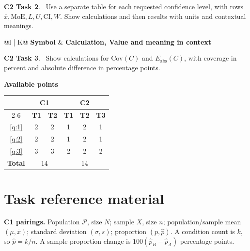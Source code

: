 \textbf{C2 Task 2}. \cTwoB\ Use a separate table for each requested confidence level, with rows $\bar x,\mathrm{MoE},L,U,\mathrm{CI},W$. Show calculations and then results with units and contextual meanings.
\begin{center}
\begin{tabularx}{\linewidth}{@{}l | K@{}}
\toprule
\textbf{Symbol} & \textbf{Calculation, Value and meaning in context}\\
\bottomrule
\end{tabularx}
\end{center}

\textbf{C2 Task 3}. \cTwoC\ Show calculations for $\mathrm{Cov}(C)$ and $E_{\mathrm{abs}}(C)$, with coverage in percent and absolute difference in percentage points. 

\endgroup




\noindent\begin{minipage}{\linewidth}
	\centering
	\textbf{Available points}\par\smallskip
	
	\centering
	\begin{tabular}{|c||c|c||c|c|c|}
		\hline
		\multirow[c]{2}{*}{\textbf{\textnumero}} & \multicolumn{2}{c||}{\textbf{C1}}
		& \multicolumn{3}{c|}{\textbf{C2}}\\
		\cline{2-6}
		& \textbf{T1} & \textbf{T2}
		& \textbf{T1} & \textbf{T2} & \textbf{T3}\\
		\hline
		\ref*{q:1} & 2 & 2 & 1 & 2 & 1\\
		\hline
		\ref*{q:2} & 2 & 2 & 1 & 2 & 1\\
		\hline
		\ref*{q:3} & 3 & 3 & 2 & 2 & 2\\
		\hline
		\textbf{Total}
		& \multicolumn{2}{c||}{14}
		& \multicolumn{3}{c|}{14}\\
		\hline
	\end{tabular}
	
\end{minipage}\par

\clearpage
\section*{Task reference material}
\textbf{C1 pairings.} Population $\mathcal P$, size $N$; sample $X$, size $n$; population/sample mean $(\mu,\bar x)$; standard deviation $(\sigma,s)$; proportion $(p,\hat p)$. A condition count is $k$, so $\hat p=k/n$. A sample-proportion change is $100(\hat p_B-\hat p_A)$ percentage points.

